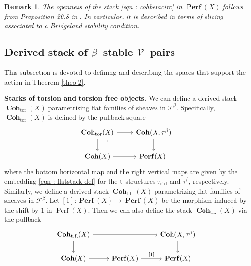 \documentclass[11pt]{article}
\newtheorem{remark}[theorem]{Remark}
\newcommand{\fbeta}{\mathcal{F}^{\beta}}
\newcommand{\tbeta}{\mathcal{T}^{\beta}}
\newcommand{\fbetastack}{\boldsymbol{\operatorname{Coh}}_{\operatorname{t.f.}}(X)}
\newcommand{\tbetastack}{\boldsymbol{\operatorname{Coh}}_{\operatorname{tor}}(X)}
\newcommand{\perf}{\operatorname{Perf}(X)}
\newcommand{\perfstack}{\boldsymbol{\operatorname{Perf}}(X)}
\newcommand{\cohflat}{\boldsymbol{\operatorname{Coh}}}
\newcommand{\framing}{\mathcal{V}}
\begin{document}
\begin{remark}
    The openness of the stack \eqref{eqn : cohbetacirc} in $\perfstack$ follows from Proposition 20.8 in \cite{Bayer_2021}. In particular, it is described in terms of \textit{slicing} associated to a Bridgeland stability condition.
\end{remark}


\subsection{Derived stack of $\beta$--stable $\framing$--pairs}\label{subsec : derived stack of pairs} 
This subsection is devoted to defining and describing the spaces that support the action in Theorem \ref{theo 2}. 

\bigskip

\noindent \textbf{Stacks of torsion and torsion free objects. }We can define a derived stack $\tbetastack$ parametrizing flat families of sheaves in $\tbeta$. Specifically, $\tbetastack$ is defined by the pullback square
\begin{equation}\label{eqn : tstd open}
\begin{tikzcd}
	\tbetastack & {\cohflat(X,\tau^\beta)} \\
	{\cohflat(X)} & \perfstack
	\arrow[from=1-1, to=1-2]
	\arrow[from=1-1, to=2-1]
	\arrow[from=1-2, to=2-2]
	\arrow[""{name=0, anchor=center, inner sep=0}, from=2-1, to=2-2]
	\arrow["\lrcorner"{anchor=center, pos=0.125}, draw=none, from=1-1, to=0] \ 
\end{tikzcd}
\end{equation}
where the bottom horizontal map and the right vertical maps are given by the embedding \eqref{eqn : flatstack def} for the t--structures $\tau_{\operatorname{std}}$ and $\tau^\beta$, respectively. Similarly, we define a derived stack $\fbetastack$ parametrizing flat families of sheaves in $\fbeta$. Let $[1] \colon \perfstack \rightarrow \perfstack$ be the morphism induced by the shift by $1$ in $\perf$. Then we can also define the stack $\fbetastack$ via the pullback
\begin{equation}
    \begin{tikzcd}
	\fbetastack && {\cohflat(X,\tau^\beta)} \\
	{\cohflat(X)} & \perfstack & \perfstack
	\arrow[from=1-1, to=1-3]
	\arrow[from=1-1, to=2-1]
	\arrow[from=1-3, to=2-3]
	\arrow[""{name=0, anchor=center, inner sep=0}, from=2-1, to=2-2]
	\arrow["{[1]}", from=2-2, to=2-3]
	\arrow["\lrcorner"{anchor=center, pos=0.125}, draw=none, from=1-1, to=0]
\end{tikzcd}
\end{equation}
\end{document}

